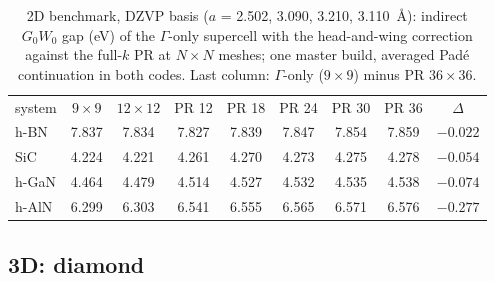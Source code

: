 \documentclass[%
 reprint,
superscriptaddress,
 amsmath,amssymb,
 aps,
prb,
]{revtex4-2}
\begin{document}
\begin{table}[h]
\caption{2D benchmark, DZVP basis ($a$ = 2.502, 3.090, 3.210, 3.110~\AA): indirect $G_0W_0$ gap
(eV) of the $\Gamma$-only supercell with the head-and-wing correction against the full-$k$ PR
at $N\times N$ meshes; one master build, averaged Pad\'e continuation in both codes. Last
column: $\Gamma$-only ($9\times9$) minus PR $36\times36$.}
\label{tab:res2d}
\begin{ruledtabular}
\footnotesize
\begin{tabular}{lcccccccc}
system & $9\times9$ & $12\times12$ & PR 12 & PR 18 & PR 24 & PR 30 & PR 36 & $\Delta$\\
\colrule
h-BN  & 7.837 & 7.834 & 7.827 & 7.839 & 7.847 & 7.854 & 7.859 & $-0.022$\\
SiC   & 4.224 & 4.221 & 4.261 & 4.270 & 4.273 & 4.275 & 4.278 & $-0.054$\\
h-GaN & 4.464 & 4.479 & 4.514 & 4.527 & 4.532 & 4.535 & 4.538 & $-0.074$\\
h-AlN & 6.299 & 6.303 & 6.541 & 6.555 & 6.565 & 6.571 & 6.576 & $-0.277$\\
\end{tabular}
\end{ruledtabular}
\end{table}

\subsection{3D: diamond}
\label{sec:res3d}
\end{document}
